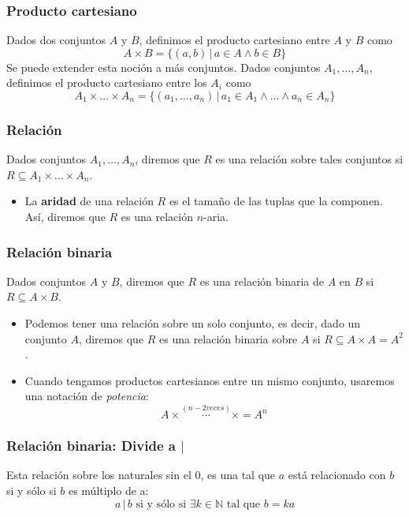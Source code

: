 \begin{multicols}{2}
    \subsubsection*{Producto cartesiano}
    Dados dos conjuntos $A$ y $B$, definimos el producto cartesiano entre $A$ y $B$ como
    $$
    A \times B = \{(a,b) \,|\, a \in A \wedge b \in B\}
    $$
    Se puede extender esta noción a más conjuntos. Dados conjuntos $A_1, \ldots, A_n$, definimos el producto cartesiano entre los $A_i$ como
    $$
    A_1 \times \ldots \times A_n = \{(a_1, \ldots, a_n) \,|\, a_1 \in A_1 \wedge \ldots \wedge a_n \in A_n\}
    $$
    
    \subsubsection*{Relación}
    Dados conjuntos $A_1, \ldots, A_n$, diremos que $R$ es una relación sobre tales conjuntos si $R \subseteq A_1 \times \ldots \times A_n$.
            \begin{itemize}
                \item La \textbf{aridad} de una relación $R$ es el tamaño de las tuplas que la componen. Así, diremos que $R$ es una relación $n$-aria.
            \end{itemize}
    
    \subsubsection*{Relación binaria}
    Dados conjuntos $A$ y $B$, diremos que $R$ es una relación binaria de $A$ en $B$ si $R \subseteq A \times B$. 
    \begin{itemize}
        \item Podemos tener una relación sobre un solo conjunto, es decir, dado un conjunto $A$, diremos que $R$ es una relación binaria sobre $A$ si $R \subseteq A \times A = A^2$.
        \item Cuando tengamos productos cartesianos entre un mismo conjunto, usaremos una notación de \textit{potencia}:
        $$
        A \times \overset{(n-2 veces)}{\cdots} \times = A^n
        $$
    \end{itemize}
    
    \subsubsection*{Relación binaria: Divide a $|$}
    Esta relación sobre los naturales sin el 0, es una tal que $a$ está relacionado con $b$ si y sólo si $b$ es múltiplo de a:
    $$
    a\,|\,b \text{ si y sólo si } \exists k \in \mathbb{N} \text{ tal que } b = ka
    $$
    

\end{multicols}
